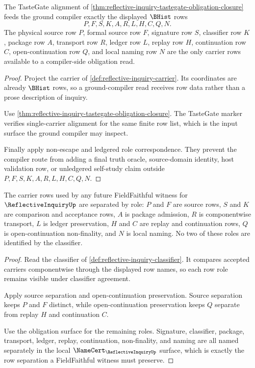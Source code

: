 \begin{theorem}
\label{thm:reflective-inquiry-ground-compiler-obligation-route}
The TasteGate alignment of \autoref{thm:reflective-inquiry-tastegate-obligation-closure} feeds the ground compiler exactly the displayed $\BHist$ rows
$$
P,F,S,K,A,R,L,H,C,Q,N .
$$
The physical source row $P$, formal source row $F$, signature row $S$, classifier row $K$, package row $A$, transport row $R$, ledger row $L$, replay row $H$, continuation row $C$, open-continuation row $Q$, and local naming row $N$ are the only carrier rows available to a compiler-side obligation read.
\end{theorem}
\begin{proof}
Project the carrier of \autoref{def:reflective-inquiry-carrier}. Its coordinates are already $\BHist$ rows, so a ground-compiler read receives row data rather than a prose description of inquiry.

Use \autoref{thm:reflective-inquiry-tastegate-obligation-closure}. The TasteGate marker verifies single-carrier alignment for the same finite row list, which is the input surface the ground compiler may inspect.

Finally apply non-escape and ledgered role correspondence. They prevent the compiler route from adding a final truth oracle, source-domain identity, host validation row, or unledgered self-study claim outside $P,F,S,K,A,R,L,H,C,Q,N$.
\end{proof}

\begin{theorem}
\label{thm:reflective-inquiry-field-faithful-row-separation}
The carrier rows used by any future FieldFaithful witness for $\ReflectiveInquiryUp$ are separated by role: $P$ and $F$ are source rows, $S$ and $K$ are comparison and acceptance rows, $A$ is package admission, $R$ is componentwise transport, $L$ is ledger preservation, $H$ and $C$ are replay and continuation rows, $Q$ is open-continuation non-finality, and $N$ is local naming. No two of these roles are identified by the classifier.
\end{theorem}
\begin{proof}
Read the classifier of \autoref{def:reflective-inquiry-classifier}. It compares accepted carriers componentwise through the displayed row names, so each row role remains visible under classifier agreement.

Apply source separation and open-continuation preservation. Source separation keeps $P$ and $F$ distinct, while open-continuation preservation keeps $Q$ separate from replay $H$ and continuation $C$.

Use the obligation surface for the remaining roles. Signature, classifier, package, transport, ledger, replay, continuation, non-finality, and naming are all named separately in the local $\NameCert_{\ReflectiveInquiryUp}$ surface, which is exactly the row separation a FieldFaithful witness must preserve.
\end{proof}

